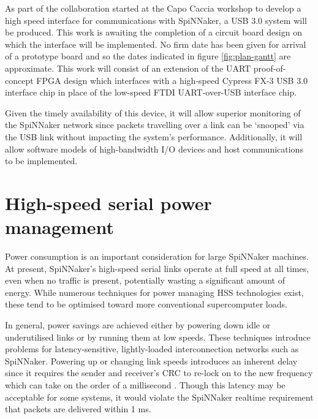 		As part of the collaboration started at the Capo Caccia workshop to develop
		a high speed interface for communications with SpiNNaker, a USB 3.0 system
		will be produced. This work is awaiting the completion of a circuit board
		design on which the interface will be implemented. No firm date has been
		given for arrival of a prototype board and so the dates indicated in figure
		\ref{fig:plan-gantt} are approximate. This work will consist of an extension
		of the UART proof-of-concept FPGA design which interfaces with a high-speed
		Cypress FX-3 USB 3.0 interface chip in place of the low-speed FTDI
		UART-over-USB interface chip.
		
		Given the timely availability of this device, it will allow superior
		monitoring of the SpiNNaker network since packets travelling over a link can
		be `snooped' via the USB link without impacting the system's performance.
		Additionally, it will allow software models of high-bandwidth I/O devices
		and host communications to be implemented.
	
	
	\section{High-speed serial power management}
		
		
		Power consumption is an important consideration for large SpiNNaker
		machines. At present, SpiNNaker's high-speed serial links operate at full
		speed at all times, even when no traffic is present, potentially wasting a
		significant amount of energy. While numerous techniques for power managing
		HSS technologies exist, these tend to be optimised toward more conventional
		supercomputer loads.
		
		In general, power savings are achieved either by powering down idle or
		underutilised links or by running them at low speeds. These techniques
		introduce problems for latency-sensitive, lightly-loaded interconnection
		networks such as SpiNNaker. Powering up or changing link speeds introduces
		an inherent delay since it requires the sender and receiver's CRC to re-lock
		on to the new frequency which can take on the order of a millisecond
		\cite{xilinx14}. Though this latency may be acceptable for some systems, it
		would violate the SpiNNaker realtime requirement that packets are delivered
		within 1 ms.
		
